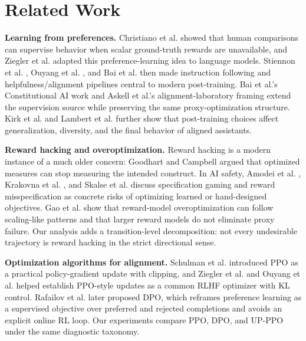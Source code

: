 \documentclass[11pt]{article}
\begin{document}
\section{Related Work}
\textbf{Learning from preferences.} Christiano et al. \cite{christiano2017deep} showed that human comparisons can supervise behavior when scalar ground-truth rewards are unavailable, and Ziegler et al. \cite{ziegler2019fine} adapted this preference-learning idea to language models. Stiennon et al. \cite{stiennon2020learning}, Ouyang et al. \cite{ouyang2022training}, and Bai et al. \cite{bai2022training} then made instruction following and helpfulness/alignment pipelines central to modern post-training. Bai et al.'s Constitutional AI work \cite{bai2022constitutional} and Askell et al.'s alignment-laboratory framing \cite{askell2021general} extend the supervision source while preserving the same proxy-optimization structure. Kirk et al. \cite{kirk2023understanding} and Lambert et al. \cite{lambert2024t} further show that post-training choices affect generalization, diversity, and the final behavior of aligned assistants.

\textbf{Reward hacking and overoptimization.} Reward hacking is a modern instance of a much older concern: Goodhart \cite{goodhart1975problems} and Campbell \cite{campbell1979assessing} argued that optimized measures can stop measuring the intended construct. In AI safety, Amodei et al. \cite{amodei2016concrete}, Krakovna et al. \cite{krakovna2020specification}, and Skalse et al. \cite{skalse2022defining} discuss specification gaming and reward misspecification as concrete risks of optimizing learned or hand-designed objectives. Gao et al. \cite{gao2023scaling} show that reward-model overoptimization can follow scaling-like patterns and that larger reward models do not eliminate proxy failure. Our analysis adds a transition-level decomposition: not every undesirable trajectory is reward hacking in the strict directional sense.

\textbf{Optimization algorithms for alignment.} Schulman et al. \cite{schulman2017proximal} introduced PPO as a practical policy-gradient update with clipping, and Ziegler et al. \cite{ziegler2019fine} and Ouyang et al. \cite{ouyang2022training} helped establish PPO-style updates as a common RLHF optimizer with KL control. Rafailov et al. \cite{rafailov2023direct} later proposed DPO, which reframes preference learning as a supervised objective over preferred and rejected completions and avoids an explicit online RL loop. Our experiments compare PPO, DPO, and UP-PPO under the same diagnostic taxonomy.
\end{document}
